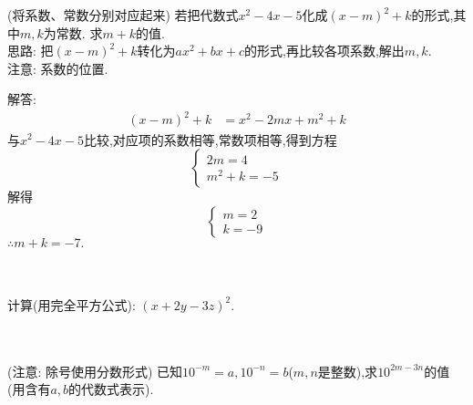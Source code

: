 \item{
    (将系数、常数分别对应起来) 若把代数式$x^2-4x-5$化成$(x-m)^2+k$的形式,其中$m,k$为常数. 求$m+k$的值.
    \ifshowSolution
    \fangsong{}
    \\
    思路: 把$(x-m)^2+k$转化为$ax^2+bx+c$的形式,再比较各项系数,解出$m,k$.\\
    注意: 系数的位置.

    解答: 
    \begin{align*}
        (x-m)^2+k &= x^2-2mx+m^2+k
    \end{align*}
    与$x^2-4x-5$比较,对应项的系数相等,常数项相等,得到方程
    \[\left\{ 
        \begin{array}{lc}
            2m = 4\\
            m^2+k=-5
        \end{array}
    \right.\]
    解得
    \[\left\{ 
        \begin{array}{lc}
            m = 2\\
            k =-9
        \end{array}
    \right.\]
    $\therefore m+k=-7.$
    \fi
    \unless\ifshowSolution
    \\ \\ \\
    \fi
}

\item{
    计算(用完全平方公式): $(x+2y-3z)^2$.
}
\\ \\ \\

\item{
    (注意: 除号使用分数形式) 已知$10^{-m}=a, 10^{-n}=b$($m, n$是整数),求$10^{2m-3n}$的值(用含有$a, b$的代数式表示).
}
\\ \\ \\

\begin{comment}
\item{
    已知$2^x=3, 2^y=6, 2^z=12$,判断下列有关$x, y, z$的数量关系式的对错.\\
    (1) $x+z=2y$\\
    (2) $x+y+3=2z$\\
    (3) $4x=z$\\
    (4) $x+1=y$
}
\\ \\
\end{comment}

